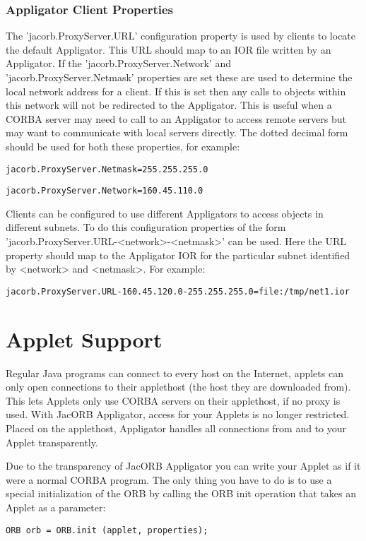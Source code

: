 \documentclass[12pt]{scrbook}
\begin{document}
\subsubsection{Appligator Client Properties}

The 'jacorb.ProxyServer.URL' configuration property is used
by clients to locate the default Appligator. This URL should map to an
IOR file written by an Appligator.  If the
'jacorb.ProxyServer.Network' and 'jacorb.ProxyServer.Netmask'
properties are set these are used to determine the local network
address for a client. If this is set then any calls to objects within
this network will not be redirected to the Appligator. This is useful
when a CORBA server may need to call to an Appligator to access remote
servers but may want to communicate with local servers directly. The
dotted decimal form should be used for both these properties, for
example: 

\verb+jacorb.ProxyServer.Netmask=255.255.255.0+

\verb+jacorb.ProxyServer.Network=160.45.110.0+

Clients can be configured to use different Appligators to access
objects in different subnets. To do this configuration properties of
the form 'jacorb.ProxyServer.URL-<network>-<netmask>' can be
used. Here the URL property should map to the Appligator IOR for the
particular subnet identified by <network> and <netmask>. For example:

\verb+jacorb.ProxyServer.URL-160.45.120.0-255.255.255.0=file:/tmp/net1.ior+

\section{Applet Support}

Regular Java programs can connect to every host on the Internet,
applets can only open connections to their applethost (the host they
are downloaded from). This lets Applets only use CORBA servers on
their applethost, if no proxy is used. With JacORB Appligator, access
for your Applets is no longer restricted. Placed on the applethost,
Appligator handles all connections from and to your Applet
transparently. 

Due to the transparency of JacORB Appligator you can write your Applet
as if it were a normal CORBA program. The only thing you have to do is
to use a special initialization of the ORB by calling the ORB init
operation that takes an Applet as a parameter: 

\verb+ORB orb = ORB.init (applet, properties);+
\end{document}
